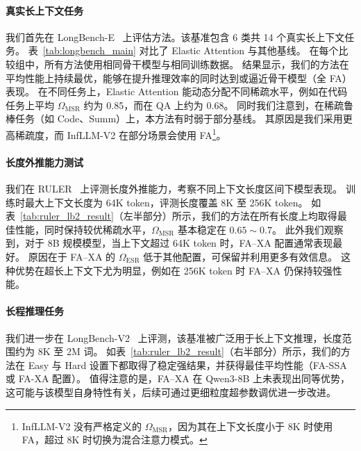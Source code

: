 \paragraph{真实长上下文任务}
我们首先在 LongBench-E~\citep{bai2024longbench} 上评估方法。该基准包含 6 类共 14 个真实长上下文任务。
表~\ref{tab:longbench_main} 对比了 Elastic Attention 与其他基线。
在每个比较组中，所有方法使用相同骨干模型与相同训练数据。
结果显示，我们的方法在平均性能上持续最优，能够在提升推理效率的同时达到或逼近骨干模型（全 FA）表现。
在不同任务上，Elastic Attention 能动态分配不同稀疏水平，例如在代码任务上平均 $\Omega_{\mathrm{MSR}}$ 约为 0.85，而在 QA 上约为 0.68。
同时我们注意到，在稀疏鲁棒任务（如 Code、Summ）上，本方法有时弱于部分基线。
其原因是我们采用更高稀疏度，而 InfLLM-V2 在部分场景会使用 FA\footnote{InfLLM-V2 没有严格定义的 $\Omega_{\mathrm{MSR}}$，因为其在上下文长度小于 8K 时使用 FA，超过 8K 时切换为混合注意力模式。}。

\paragraph{长度外推能力测试}
我们在 RULER~\citep{hsieh2024ruler} 上评测长度外推能力，考察不同上下文长度区间下模型表现。
训练时最大上下文长度为 64K token，评测长度覆盖 8K 至 256K token。
如表~\ref{tab:ruler_lb2_result}（左半部分）所示，我们的方法在所有长度上均取得最佳性能，同时保持较优稀疏水平，$\Omega_{\mathrm{MSR}}$ 基本稳定在 $0.65\sim 0.7$。
此外我们观察到，对于 8B 规模模型，当上下文超过 64K token 时，FA–XA 配置通常表现最好。
原因在于 FA–XA 的 $\Omega_{\mathrm{ESR}}$ 低于其他配置，可保留并利用更多有效信息。
这种优势在超长上下文下尤为明显，例如在 256K token 时 FA–XA 仍保持较强性能。

\paragraph{长程推理任务}
我们进一步在 LongBench-V2~\citep{bai2024longbench2} 上评测，该基准被广泛用于长上下文推理，长度范围约为 8K 至 2M 词。
如表~\ref{tab:ruler_lb2_result}（右半部分）所示，我们的方法在 Easy 与 Hard 设置下都取得了稳定强结果，并获得最佳平均性能（FA-SSA 或 FA-XA 配置）。
值得注意的是，FA–XA 在 Qwen3-8B 上未表现出同等优势，这可能与该模型自身特性有关，后续可通过更细粒度超参数调优进一步改进。



